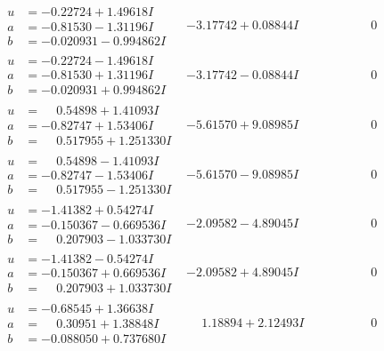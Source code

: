 \documentclass[1p]{elsarticle_modified}
\theoremstyle{definition}
\begin{document}
$$\begin{array}{c|c|c}
\begin{aligned}
u &= -0.22724 + 1.49618 I \\
a &= -0.81530 - 1.31196 I \\
b &= -0.020931 - 0.994862 I\end{aligned}
 & -3.17742 + 0.08844 I & \phantom{-0.000000 } 0 \\ \hline\begin{aligned}
u &= -0.22724 - 1.49618 I \\
a &= -0.81530 + 1.31196 I \\
b &= -0.020931 + 0.994862 I\end{aligned}
 & -3.17742 - 0.08844 I & \phantom{-0.000000 } 0 \\ \hline\begin{aligned}
u &= \phantom{-}0.54898 + 1.41093 I \\
a &= -0.82747 + 1.53406 I \\
b &= \phantom{-}0.517955 + 1.251330 I\end{aligned}
 & -5.61570 + 9.08985 I & \phantom{-0.000000 } 0 \\ \hline\begin{aligned}
u &= \phantom{-}0.54898 - 1.41093 I \\
a &= -0.82747 - 1.53406 I \\
b &= \phantom{-}0.517955 - 1.251330 I\end{aligned}
 & -5.61570 - 9.08985 I & \phantom{-0.000000 } 0 \\ \hline\begin{aligned}
u &= -1.41382 + 0.54274 I \\
a &= -0.150367 - 0.669536 I \\
b &= \phantom{-}0.207903 - 1.033730 I\end{aligned}
 & -2.09582 - 4.89045 I & \phantom{-0.000000 } 0 \\ \hline\begin{aligned}
u &= -1.41382 - 0.54274 I \\
a &= -0.150367 + 0.669536 I \\
b &= \phantom{-}0.207903 + 1.033730 I\end{aligned}
 & -2.09582 + 4.89045 I & \phantom{-0.000000 } 0 \\ \hline\begin{aligned}
u &= -0.68545 + 1.36638 I \\
a &= \phantom{-}0.30951 + 1.38848 I \\
b &= -0.088050 + 0.737680 I\end{aligned}
 & \phantom{-}1.18894 + 2.12493 I & \phantom{-0.000000 } 0 \\ \hline\begin{aligned}

\end{aligned}
\end{array}$$
\end{document}
